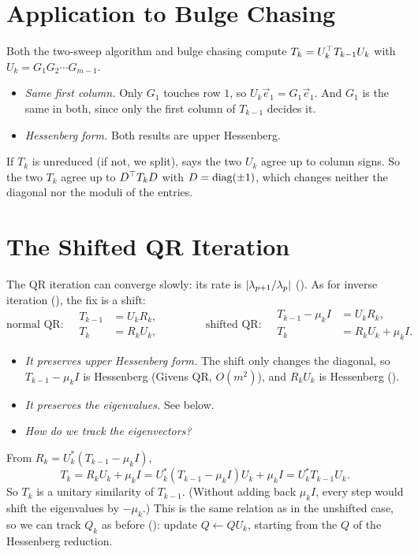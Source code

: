 \section{Application to Bulge Chasing}
\label{sec:implicit-q-bulge}

Both the two-sweep algorithm and bulge chasing compute $T_k = U_k^\top T_{k-1}U_k$ with $U_k = G_1G_2\cdots G_{m-1}$.
\begin{itemize}
  \item \emph{Same first column.} Only $G_1$ touches row $1$, so $U_k\vec{e}_1 = G_1\vec{e}_1$. And $G_1$ is the same in both, since only the first column of $T_{k-1}$ decides it.
  \item \emph{Hessenberg form.} Both results are upper Hessenberg.
\end{itemize}
If $T_k$ is unreduced (if not, we split),  says the two $U_k$ agree up to column signs. So the two $T_k$ agree up to $D^\top T_kD$ with $D = \operatorname{diag}(\pm 1)$, which changes neither the diagonal nor the moduli of the entries.

\section{The Shifted QR Iteration}
\label{sec:shifted-qr}

The QR iteration can converge slowly: its rate is $\left\lvert \lambda_{p+1}/\lambda_p \right\rvert$ (). As for inverse iteration (), the fix is a shift:
\begin{equation}
  \text{normal QR:}\quad
  \begin{aligned}
    T_{k-1} &= U_kR_k, \\
    T_k &= R_kU_k,
  \end{aligned}
  \qquad\qquad
  \text{shifted QR:}\quad
  \begin{aligned}
    T_{k-1} - \mu_kI &= U_kR_k, \\
    T_k &= R_kU_k + \mu_kI.
  \end{aligned}
\end{equation}

\begin{itemize}
  \item \emph{It preserves upper Hessenberg form.} The shift only changes the diagonal, so $T_{k-1} - \mu_kI$ is Hessenberg (Givens QR, $O(m^2)$), and $R_kU_k$ is Hessenberg ().
  \item \emph{It preserves the eigenvalues.} See below.
  \item \emph{How do we track the eigenvectors?}
\end{itemize}
From $R_k = U_k^\ast(T_{k-1} - \mu_kI)$,
\begin{equation}
  T_k = R_kU_k + \mu_kI = U_k^\ast(T_{k-1} - \mu_kI)U_k + \mu_kI = U_k^\ast T_{k-1}U_k.
\end{equation}
So $T_k$ is a unitary similarity of $T_{k-1}$. (Without adding back $\mu_kI$, every step would shift the eigenvalues by $-\mu_k$.) This is the same relation as in the unshifted case, so we can track $Q_k$ as before (): update $Q \gets QU_k$, starting from the $Q$ of the Hessenberg reduction.

